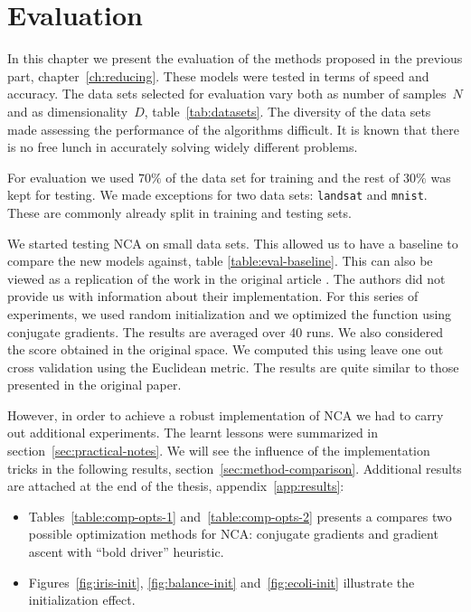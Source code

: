 \chapter{Evaluation}
\label{ch:evaluation}

In this chapter we present the evaluation of the methods proposed in the previous part, chapter~\ref{ch:reducing}. These models were tested in terms of speed and accuracy. The data sets selected for evaluation vary both as number of samples~$N$ and as dimensionality~$D$, table~\ref{tab:datasets}. The diversity of the data sets made assessing the performance of the algorithms difficult. It is known that there is no free lunch in accurately solving widely different problems.

For evaluation we used $70\%$ of the data set for training and the rest of $30\%$ was kept for testing. We made exceptions for two data sets: \texttt{landsat} and \texttt{mnist}. These are commonly already split in training and testing sets.

We started testing NCA on small data sets. This allowed us to have a baseline to compare the new models against, table \ref{table:eval-baseline}. This can also be viewed as a replication of the work in the original article \citet{goldberger2004}. The authors did not provide us with information about their implementation. For this series of experiments, we used random initialization and we optimized the function using conjugate gradients. The results are averaged over 40 runs. We also considered the score obtained in the original space. We computed this using leave one out cross validation using the Euclidean metric. The results are quite similar to those presented in the original paper.  

However, in order to achieve a robust implementation of NCA we had to carry out additional experiments. The learnt lessons were summarized in section~\ref{sec:practical-notes}. We will see the influence of the implementation tricks in the following results, section~\ref{sec:method-comparison}. Additional results are attached at the end of the thesis, appendix~\ref{app:results}:
\begin{itemize}
 \item Tables~\ref{table:comp-opts-1} and~\ref{table:comp-opts-2} presents a compares two possible optimization methods for NCA: conjugate gradients and gradient ascent with ``bold driver'' heuristic.
 \item Figures~\ref{fig:iris-init}, \ref{fig:balance-init} and~\ref{fig:ecoli-init} illustrate the initialization effect. 
\end{itemize}

